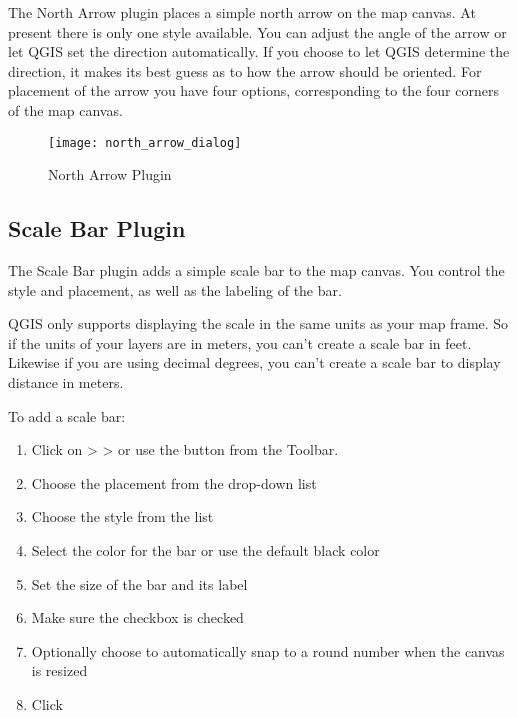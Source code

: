 The North Arrow plugin places a simple north arrow on the map canvas. At
present there is only one style available. You can adjust the angle of the
arrow or let QGIS set the direction automatically. If you choose to let
QGIS determine the direction, it makes its best guess as to how the arrow
should be oriented. For placement of the arrow you have four options, 
corresponding to the four corners of the map canvas.

\begin{figure}[ht]
   \begin{center}
   \caption{North Arrow Plugin \nixcaption}\label{fig:north_arrow}\smallskip
   \texttt{[image: north\_arrow\_dialog]}
\end{center}  
\end{figure}

\subsection{Scale Bar Plugin}
The Scale Bar plugin adds a simple scale bar to the map canvas. You
control the style and placement, as well as the labeling of the bar. 

QGIS only supports displaying the scale in the same units as your map frame. So
if the units of your layers are in meters, you can't create a scale bar in
feet. Likewise if you are using decimal degrees, you can't create a scale
bar to display distance in meters.

To add a scale bar:

\begin{enumerate}
\item Click on  >  >  or use the  button from the Toolbar.
\item Choose the placement from the  drop-down list
\item Choose the style from the  list
\item Select the color for the bar  or use the default black color
\item Set the size of the bar and its label 
\item Make sure the  checkbox is checked
\item Optionally choose to automatically snap to a round number when the
  canvas is resized 
\item Click  
\end{enumerate} 

